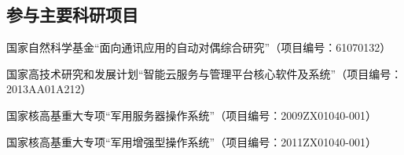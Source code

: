 \begin{resume}
  \section*{参与主要科研项目} %
  \begin{enumerate}[{[}1{]}]
  \addtolength{\itemsep}{-.36\baselineskip}%
  \item 国家自然科学基金“面向通讯应用的自动对偶综合研究”（项目编号：61070132）
  \item 国家高技术研究和发展计划“智能云服务与管理平台核心软件及系统”（项目编号：2013AA01A212）
  \item 国家核高基重大专项“军用服务器操作系统”（项目编号：2009ZX01040-001） 	
  \item 国家核高基重大专项“军用增强型操作系统”（项目编号：2011ZX01040-001） 	
   \end{enumerate}
\end{resume}
